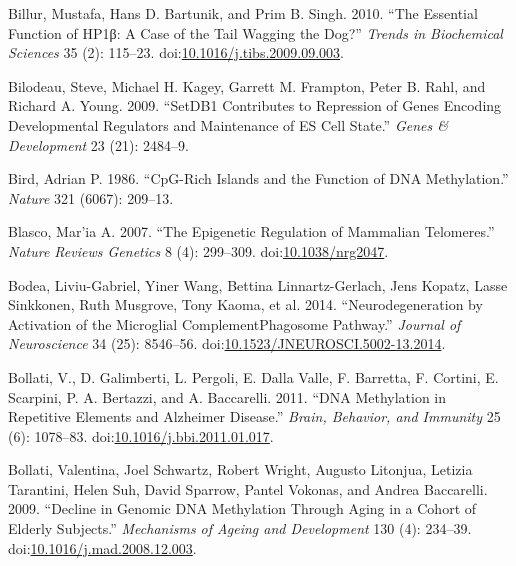 \documentclass[onehalf,12pt]{beavtex}
\begin{document}
  \hypertarget{ref-BilluressentialfunctionHP1v2010}{}
  Billur, Mustafa, Hans D. Bartunik, and Prim B. Singh. 2010. ``The
  Essential Function of HP1β: A Case of the Tail Wagging the Dog?''
  \emph{Trends in Biochemical Sciences} 35 (2): 115--23.
  doi:\href{https://doi.org/10.1016/j.tibs.2009.09.003}{10.1016/j.tibs.2009.09.003}.
  
  \hypertarget{ref-BilodeauSetDB1contributesrepression2009}{}
  Bilodeau, Steve, Michael H. Kagey, Garrett M. Frampton, Peter B. Rahl,
  and Richard A. Young. 2009. ``SetDB1 Contributes to Repression of Genes
  Encoding Developmental Regulators and Maintenance of ES Cell State.''
  \emph{Genes \& Development} 23 (21): 2484--9.
  
  \hypertarget{ref-BirdCpGrichislandsfunction1986}{}
  Bird, Adrian P. 1986. ``CpG-Rich Islands and the Function of DNA
  Methylation.'' \emph{Nature} 321 (6067): 209--13.
  
  \hypertarget{ref-Blascoepigeneticregulationmammalian2007}{}
  Blasco, Mar\a'ia A. 2007. ``The Epigenetic Regulation of Mammalian
  Telomeres.'' \emph{Nature Reviews Genetics} 8 (4): 299--309.
  doi:\href{https://doi.org/10.1038/nrg2047}{10.1038/nrg2047}.
  
  \hypertarget{ref-BodeaNeurodegenerationActivationMicroglial2014}{}
  Bodea, Liviu-Gabriel, Yiner Wang, Bettina Linnartz-Gerlach, Jens Kopatz,
  Lasse Sinkkonen, Ruth Musgrove, Tony Kaoma, et al. 2014.
  ``Neurodegeneration by Activation of the Microglial ComplementPhagosome
  Pathway.'' \emph{Journal of Neuroscience} 34 (25): 8546--56.
  doi:\href{https://doi.org/10.1523/JNEUROSCI.5002-13.2014}{10.1523/JNEUROSCI.5002-13.2014}.
  
  \hypertarget{ref-BollatiDNAmethylationrepetitive2011}{}
  Bollati, V., D. Galimberti, L. Pergoli, E. Dalla Valle, F. Barretta, F.
  Cortini, E. Scarpini, P. A. Bertazzi, and A. Baccarelli. 2011. ``DNA
  Methylation in Repetitive Elements and Alzheimer Disease.'' \emph{Brain,
  Behavior, and Immunity} 25 (6): 1078--83.
  doi:\href{https://doi.org/10.1016/j.bbi.2011.01.017}{10.1016/j.bbi.2011.01.017}.
  
  \hypertarget{ref-BollatiDeclinegenomicDNA2009}{}
  Bollati, Valentina, Joel Schwartz, Robert Wright, Augusto Litonjua,
  Letizia Tarantini, Helen Suh, David Sparrow, Pantel Vokonas, and Andrea
  Baccarelli. 2009. ``Decline in Genomic DNA Methylation Through Aging in
  a Cohort of Elderly Subjects.'' \emph{Mechanisms of Ageing and
  Development} 130 (4): 234--39.
  doi:\href{https://doi.org/10.1016/j.mad.2008.12.003}{10.1016/j.mad.2008.12.003}.
  
\end{document}
